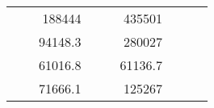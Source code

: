 \begin{table}[]
\begin{tabular}{|ccrccrccc}
\multicolumn{1}{|c|}{\cellcolor[HTML]{FFFFC7}}                                & \multicolumn{1}{c|}{\cellcolor[HTML]{DDFDFF}}                      & \multicolumn{1}{r|}{\cellcolor[HTML]{DAE8FC}188444}    & \multicolumn{1}{c|}{\cellcolor[HTML]{FFFFC7}}                                & \multicolumn{1}{c|}{\cellcolor[HTML]{DDFDFF}}                       & \multicolumn{1}{r|}{\cellcolor[HTML]{DDFDFF}435501}    &                                                                              &                                                                    &                                                        \\ \cline{3-3} \cline{6-6}
\multicolumn{1}{|c|}{\cellcolor[HTML]{FFFFC7}}                                & \multicolumn{1}{c|}{\cellcolor[HTML]{DDFDFF}}                      & \multicolumn{1}{r|}{\cellcolor[HTML]{DDFDFF}94148.3}   & \multicolumn{1}{c|}{\cellcolor[HTML]{FFFFC7}}                                & \multicolumn{1}{c|}{\cellcolor[HTML]{DDFDFF}}                       & \multicolumn{1}{r|}{\cellcolor[HTML]{DAE8FC}280027}    &                                                                              &                                                                    &                                                        \\ \cline{3-3} \cline{6-6}
\multicolumn{1}{|c|}{\cellcolor[HTML]{FFFFC7}}                                & \multicolumn{1}{c|}{\cellcolor[HTML]{DDFDFF}}                      & \multicolumn{1}{r|}{\cellcolor[HTML]{DAE8FC}61016.8}   & \multicolumn{1}{c|}{\cellcolor[HTML]{FFFFC7}}                                & \multicolumn{1}{c|}{\cellcolor[HTML]{DDFDFF}}                       & \multicolumn{1}{r|}{\cellcolor[HTML]{DDFDFF}61136.7}   &                                                                              &                                                                    &                                                        \\ \cline{3-3} \cline{6-6}
\multicolumn{1}{|c|}{\cellcolor[HTML]{FFFFC7}}                                & \multicolumn{1}{c|}{\cellcolor[HTML]{DDFDFF}}                      & \multicolumn{1}{r|}{\cellcolor[HTML]{DDFDFF}71666.1}   & \multicolumn{1}{c|}{\cellcolor[HTML]{FFFFC7}}                                & \multicolumn{1}{c|}{\cellcolor[HTML]{DDFDFF}}                       & \multicolumn{1}{r|}{\cellcolor[HTML]{DAE8FC}125267}    &                                                                              &                                                                    &                                                        \\ \cline{3-3} \cline{6-6}

\end{tabular}
\end{table}
